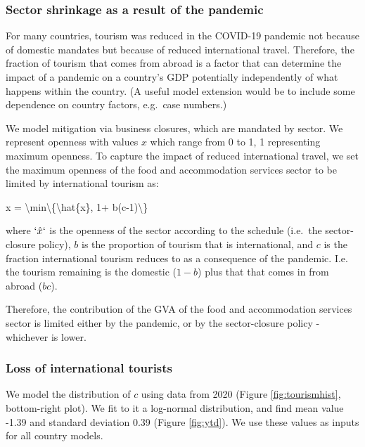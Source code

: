 \documentclass[
]{article}
\newenvironment{Shaded}{\begin{snugshade}}{\end{snugshade}}
\newcommand{\NormalTok}[1]{#1}
\begin{document}
\newpage

\subsubsection{Sector shrinkage as a result of the pandemic}\label{sector-shrinkage-as-a-result-of-the-pandemic}

For many countries, tourism was reduced in the COVID-19 pandemic not because of domestic mandates but because of reduced international travel. Therefore, the fraction of tourism that comes from abroad is a factor that can determine the impact of a pandemic on a country's GDP potentially independently of what happens within the country. (A useful model extension would be to include some dependence on country factors, e.g.~case numbers.)

We model mitigation via business closures, which are mandated by sector. We represent openness with values \(x\) which range from 0 to 1, 1 representing maximum openness. To capture the impact of reduced international travel, we set the maximum openness of the food and accommodation services sector to be limited by international tourism as:

\begin{Shaded}
\begin{Highlighting}[]
\NormalTok{x = \textbackslash{}min\textbackslash{}\{\textbackslash{}hat\{x\}, 1+ b(c{-}1)\textbackslash{}\}}
\end{Highlighting}
\end{Shaded}

where \(`\hat{x}`\) is the openness of the sector according to the schedule (i.e.~the sector-closure policy), \(b\) is the proportion of tourism that is international, and \(c\) is the fraction international tourism reduces to as a consequence of the pandemic. I.e. the tourism remaining is the domestic (\(1-b\)) plus that that comes in from abroad (\(bc\)).

Therefore, the contribution of the GVA of the food and accommodation services sector is limited either by the pandemic, or by the sector-closure policy - whichever is lower.

\subsubsection{Loss of international tourists}\label{loss-of-international-tourists}

We model the distribution of \(c\) using data from 2020 (Figure \ref{fig:tourismhist}, bottom-right plot). We fit to it a log-normal distribution, and find mean value -1.39 and standard deviation 0.39 (Figure \ref{fig:ytd}). We use these values as inputs for all country models.
\end{document}
